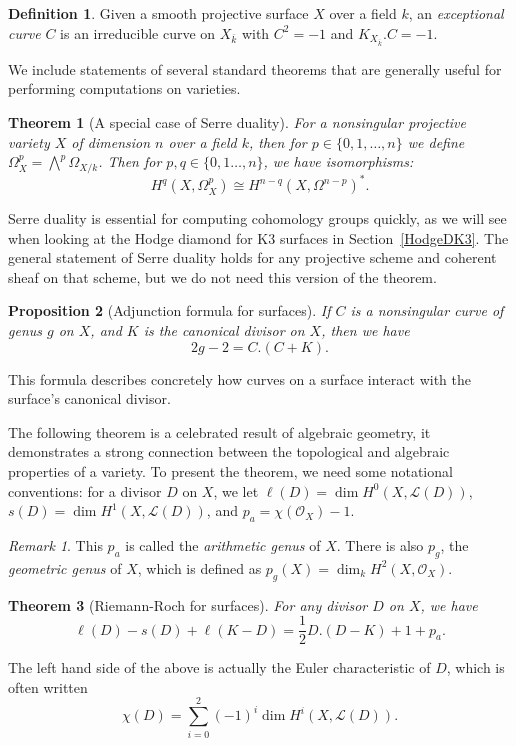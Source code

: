 \documentclass[12pt,twoside]{reedthesis}
\theoremstyle{plain}
\newtheorem{theorem}{Theorem}[chapter]
\newtheorem{proposition}[theorem]{Proposition}
\theoremstyle{definition}
\newtheorem{definition}{Definition}[section]
\theoremstyle{remark}
\newtheorem{remark}{Remark}[section]
\newcommand{\calO}{\mathcal{O}}
\newcommand{\calL}{\mathcal{L}}
\begin{document}
\begin{definition} Given a smooth projective surface $X$ over a field $k$, an \emph{exceptional curve} $C$ is an irreducible curve on $X_{\overline{k}}$ with $C^2=-1$ and $K_{X_{\overline{k}}}.C=-1$.
\end{definition}
We include statements of several standard theorems that are generally useful for performing computations on varieties.
\begin{theorem}[A special case of Serre duality]
For a nonsingular projective variety $X$ of dimension $n$ over a field $k$, then for $p\in\{0,1,\ldots,n\}$ we define $\Omega_{X}^p=\bigwedge^p\Omega_{X/k}$. Then for $p,q\in\{0,1\ldots,n\}$, we have isomorphisms:
\[
H^q(X,\Omega_X^p)\cong H^{n-q}(X,\Omega^{n-p})^*.
\]
\end{theorem}
\noindent Serre duality is essential for computing cohomology groups quickly, as we will see when looking at the Hodge diamond for K3 surfaces in Section~\ref{HodgeDK3}. The general statement of Serre duality holds for any projective scheme and coherent sheaf on that scheme, but we do not need this version of the theorem.
\begin{proposition}[Adjunction formula for surfaces]
If $C$ is a nonsingular curve of genus $g$ on $X$, and $K$ is the canonical divisor on $X$, then we have
\[2g-2=C.(C+K).\]
\end{proposition}
\noindent This formula describes concretely how curves on a surface interact with the surface's canonical divisor.

The following theorem is a celebrated result of algebraic geometry, it demonstrates a strong connection between the topological and algebraic properties of a variety. To present the theorem, we need some notational conventions: for a divisor $D$ on $X$, we let $\ell(D)=\dim H^0(X,\mathcal{L}(D))$, $s(D)=\dim H^1(X,\mathcal{L}(D))$, and $p_a=\chi(\calO_X)-1$.
\begin{remark}
This $p_a$ is called the \emph{arithmetic genus} of $X$. There is also $p_g$, the \emph{geometric genus} of $X$, which is defined as $p_g(X)=\dim_k H^2(X,\calO_X)$.
\end{remark}
\begin{theorem}[Riemann-Roch for surfaces]
For any divisor $D$ on $X$, we have \[\ell(D)-s(D)+\ell(K-D)=\frac{1}{2}D.(D-K)+1+p_a.\]
\end{theorem}
\noindent The left hand side of the above is actually the Euler characteristic of $D$, which is often written
\[
\chi(D)=\sum_{i=0}^2 (-1)^i\dim H^i(X,\calL(D)).
\]
\end{document}

